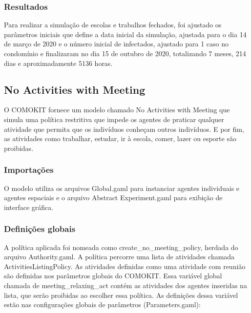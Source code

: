 
\subsubsection{Resultados}

Para realizar a simulação de escolas e trabalhos fechados, foi ajustado os parâmetros iniciais que define a data inicial da simulação, ajustada para o dia 14 de março de 2020 e o número inicial de infectados, ajustado para 1 caso no condomínio e finalizaram no dia 15 de outubro de 2020, totalizando 7 meses, 214 dias e aproximadamente 5136 horas.



\subsection{No Activities with Meeting}

O COMOKIT fornece um modelo chamado No Activities with Meeting que simula uma política restritiva que impede os agentes de praticar qualquer atividade que permita que os indivíduos conheçam outros indivíduos. E por fim, as atividades como trabalhar, estudar, ir à escola, comer, lazer ou esporte são proibidas.


\subsubsection{Importações}

O modelo utiliza os arquivos Global.gaml para instanciar agentes individuais e agentes espaciais e o arquivo Abstract Experiment.gaml para exibição de interface gráfica.

\subsubsection{Definições globais}

A política aplicada foi nomeada como create\_no\_meeting\_policy, herdada do arquivo Authority.gaml. A política percorre uma lista de atividades chamada ActivitiesListingPolicy. As atividades definidas como uma atividade com reunião são definidas nos parâmetros globais do COMOKIT. Essa variável global chamada de meeting\_relaxing\_act contém as atividades dos agentes inseridas na lista, que serão proibidas ao escolher essa política. As definições dessa variável estão nas configurações globais de parâmetros (Parameters.gaml):

